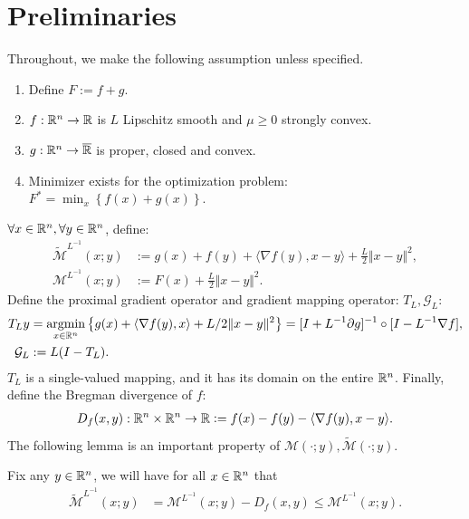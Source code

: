 \documentclass[12pt]{article}
\begin{document}
\section{Preliminaries}\label{sec:preliminaries}
    Throughout, we make the following assumption unless specified. 
    \begin{assumption}\label{ass:smooth-nsmooth-additive}
        \;
        \begin{enumerate}
            \item Define $F := f + g$. 
            \item $f: \mathbb R^n \rightarrow \mathbb R$ is $L$ Lipschitz smooth and $\mu \ge 0$ strongly convex. 
            \item $g: \mathbb R^n \rightarrow \overline {\mathbb R}$ is proper, closed and convex. 
            \item Minimizer exists for the optimization problem: $F^* = \min_x \left\lbrace f(x) + g(x)\right\rbrace$. 
        \end{enumerate}
    \end{assumption}
    $\forall x \in \mathbb R^n,\forall y \in \mathbb R^n$, define: 
    \begin{align*}
        \widetilde{\mathcal M}^{L^{-1}}
        (x; y) 
        &:=
        g(x) + f(y) + \langle \nabla f(y), x - y\rangle 
        + \frac{L}{2}\Vert x - y\Vert^2, 
        \\
        \mathcal M^{L^{-1}}(x; y) &:= F(x) + \frac{L}{2}\Vert x - y\Vert^2. 
    \end{align*}
    Define the proximal gradient operator and gradient mapping operator: $T_L, \mathcal G_L$: 
    \begin{align*}
        T_Ly &= \mathop{\rm argmin}\limits_{x \in \mathbb R^n} \left\lbrace
            g(x) + \langle \nabla f(y), x\rangle + L/2\Vert x - y\Vert^2
        \right\rbrace = [I + L^{-1}\partial g]^{-1}\circ [I - L^{-1}\nabla f], 
        \\
        \mathcal G_L 
        &:= L(I - T_L). 
    \end{align*}
    $T_L$ is a single-valued mapping, and it has its domain on the entire $\mathbb R^n$. 
    Finally, define the Bregman divergence of $f$: 
    \begin{align*}
        D_f(x, y): \mathbb R^n \times \mathbb R^n \rightarrow \mathbb R 
        \vcentcolon= f(x) - f(y) - \langle \nabla f(y), x - y\rangle. 
    \end{align*}
    The following lemma is an important property of $\mathcal M(\cdot; y), \widetilde{\mathcal M}(\cdot; y)$. 
    \begin{lemma}\label{lemma:pg-envelope}
        Fix any $y \in \mathbb R^n$, we will have for all $x \in \mathbb R^n$ that
        \begin{align*}
            \widetilde{\mathcal M}^{L^{-1}}(x; y)
            &= 
            \mathcal M^{L^{-1}}(x; y)- D_f(x, y) \le \mathcal M^{L^{-1}}(x; y). 
        \end{align*}
    \end{lemma}
\end{document}
